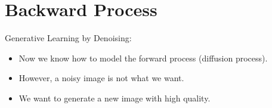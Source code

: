 


\section{Backward Process}

Generative Learning by Denoising:
	\begin{itemize}
		\item Now we know how to model the forward process (diffusion process).
		\item However, a noisy image is not what we want.
		\item We want to generate a new image with high quality.
	\end{itemize}

